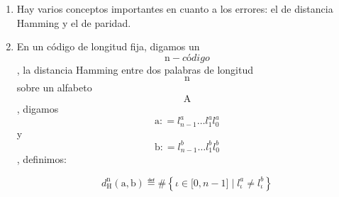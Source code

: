 \begin{enumerate}
\begin{enumerate}
\begin{enumerate}
\begin{enumerate}
      \item
        La probabilidad de error sobre un valor 0 o un valor 1 ha de ser
        muy parecida, de forma que la asimetría sea inapreciable.
      \end{enumerate}
    \item
      Hay varios conceptos importantes en cuanto a los errores: el de
      distancia Hamming y el de paridad.
    \item
      En un código de longitud fija, digamos un
      \[\mathtt{\mathrm{n}} - \mathit{código}\], la distancia Hamming
      en\-tre dos palabras de longitud \[\mathtt{\mathrm{n}}\] sobre un
      alfabeto \[\mathtt{\mathrm{A}}\], digamos
      \[\mathtt{\mathrm{a}}{: = l_{n - 1}^{a}}\ldots l_{1}^{a}l_{0}^{a}\]y
      \[\mathtt{\mathrm{b}}{: = l_{n - 1}^{b}}\ldots l_{1}^{b}l_{0}^{b}\],
      definimos:

      \[d_{\mathtt{\mathrm{H}}}^{\mathtt{\mathrm{n}}}\left( \mathtt{\mathrm{a,b}} \right) ≝ \#\left\{ {{\iota \in {\lbrack{0,{n - 1}}\rbrack}} \mid {l_{\iota}^{a} \neq l_{\iota}^{b}}} \right\}\]


\end{enumerate}
\end{enumerate}
\end{enumerate}
